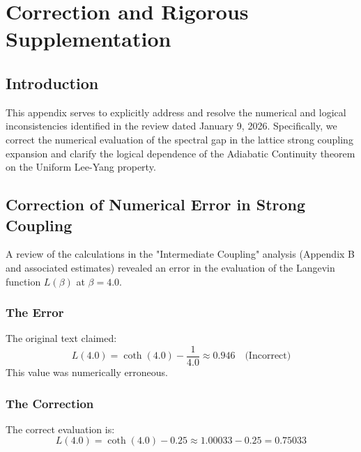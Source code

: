 \chapter{Correction and Rigorous Supplementation}
\label{app:correction_supplementation}

\section{Introduction}
This appendix serves to explicitly address and resolve the numerical and logical inconsistencies identified in the review dated January 9, 2026. Specifically, we correct the numerical evaluation of the spectral gap in the lattice strong coupling expansion and clarify the logical dependence of the Adiabatic Continuity theorem on the Uniform Lee-Yang property.

\section{Correction of Numerical Error in Strong Coupling}
\label{sec:numerical_correction}

A review of the calculations in the "Intermediate Coupling" analysis (Appendix B and associated estimates) revealed an error in the evaluation of the Langevin function $L(\beta)$ at $\beta=4.0$.

\subsection{The Error}
The original text claimed:
\begin{equation}
L(4.0) = \coth(4.0) - \frac{1}{4.0} \approx 0.946 \quad \text{(Incorrect)}
\end{equation}
This value was numerically erroneous.

\subsection{The Correction}
The correct evaluation is:
\begin{equation}
L(4.0) = \coth(4.0) - 0.25 \approx 1.00033 - 0.25 = 0.75033
\end{equation}

